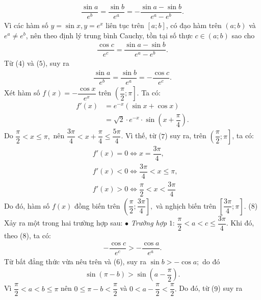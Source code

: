 \begin{multicols}{2}
\begin{align*}
		\dfrac{{\sin a}}{{{e^b}}} = \dfrac{{\sin b}}{{{e^a}}} =  - \dfrac{{\sin a - \sin b}}{{{e^a} - {e^b}}}. \tag{$4$}
	\end{align*}
	Vì các hàm số  $y = \sin x, y = e^x$ liên tục trên  $[a;b]$, có đạo hàm trên $(a;b)$  và $e^a \ne e^b$,  nên theo định lý trung bình Cauchy, tồn tại số thực $c \in (a;b)$  sao cho
	\begin{align*}
		\dfrac{{\cos c}}{{{e^c}}} = \dfrac{{\sin a - \sin b}}{{{e^a} - {e^b}}}. \tag{$5$}
	\end{align*}
	Từ ($4$) và ($5$), suy ra
	\begin{align*}
		\dfrac{{\sin a}}{{{e^b}}} = \dfrac{{\sin b}}{{{e^a}}} =  - \dfrac{{\cos c}}{{{e^c}}}. \tag{$6$}
	\end{align*}
	Xét hàm số $f\left( x \right) =  - \dfrac{{\cos x}}{{{e^x}}}$  trên  $\left( {\dfrac{\pi }{2};\pi } \right]$. Ta có:
	\begin{align*}
		f'\left( x \right) &= {e^{ - x}}\left( {\sin x + \cos x} \right) \\[-0.6ex]
		&= \sqrt 2  \cdot {e^{ - x}} \cdot \sin \left( {x + \dfrac{\pi }{4}} \right). \tag{$7$}
	\end{align*}
	Do $\dfrac{\pi }{2} < x \le \pi ,$ nên  $\dfrac{{3\pi }}{4} < x + \dfrac{\pi }{4} \le \dfrac{{5\pi }}{4}$. Vì thế, từ ($7$) suy ra, trên $\left( {\dfrac{\pi }{2};\pi } \right]$,  ta có:
	\begin{align*}
		&f'(x) = 0   \Leftrightarrow x = \dfrac{3\pi}{4},\\
		&f'(x) < 0 \Leftrightarrow \dfrac{3\pi}{4} < x \le \pi,\\
		&f'(x) > 0 \Leftrightarrow \dfrac{\pi}{2} < x < \dfrac{3\pi}{4}
	\end{align*}
	Do đó, hàm số  $f(x)$ đồng biến trên $\left( {\dfrac{\pi }{2};\dfrac{{3\pi }}{4}} \right]\!\!,$  và nghịch biến trên  $\left[ {\dfrac{{3\pi }}{4};\pi } \right]\!\!.$ \hfill ($8$)
	\vskip 0.01cm
	Xảy ra một trong hai trường hợp sau:
	\vskip 0.01cm
	$\bullet$ \textit{Trường hợp} $1$:  $\dfrac{\pi }{2} < a < c \le \dfrac{{3\pi }}{4}.$
	\vskip 0.01cm
	Khi đó, theo ($8$), ta có:
	\begin{align*}
		-\dfrac{{\cos c}}{{{e^c}}} >  - \dfrac{{\cos a}}{{{e^a}}}.
	\end{align*}
	Từ bất đẳng thức vừa nêu trên và ($6$), suy ra $\sin b >  - \cos a;$  do đó
	\begin{align*}
		\sin \left( {\pi  - b} \right) > \sin \left( {a - \dfrac{\pi }{2}} \right). \tag{$9$}
	\end{align*}
	Vì $\dfrac{\pi }{2} < a < b \le \pi $ nên $0 \le \pi  - b < \dfrac{\pi }{2}$  và  $0 < a - \dfrac{\pi }{2} < \dfrac{\pi }{2}.$ Do đó, từ ($9$) suy ra

\end{multicols}
